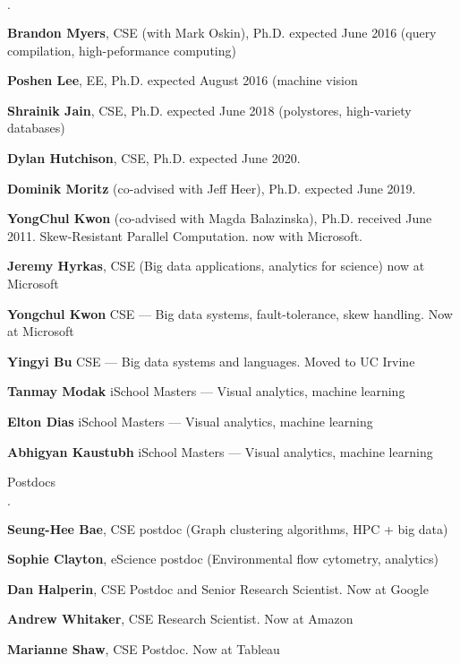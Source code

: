 \documentclass[10pt]{article}
\newenvironment{bulletlist}
   {
      \begin{list}
         {$\cdot$}
         {
            \setlength{\itemsep}{.5ex}
            \setlength{\parsep}{0ex}
            \setlength{\leftmargin}{0.7em}
            \setlength{\parskip}{0ex}
            \setlength{\topsep}{0ex}
         }
   }
   {
      \end{list}
   }
\newcommand{\marginlabel}[1]{
\begin{minipage}[b]{0.8\labelwidth}{\large \textsf{\textbf{#1}}}\end{minipage}}
\newcommand{\entrylabel}[1]{\mbox{\marginlabel{#1}}\hfill}
\newcommand{\MainListlabel}[1]
   {
      \parbox[t]{\labelwidth}{\hspace{.8em}\marginlabel{#1}}
   }
\newenvironment{MainList}[1]
   {
      \renewcommand{\entrylabel}{\MainListlabel}
      \begin{list}{}
      {
         \renewcommand{\makelabel}{\entrylabel}
         \setlength   {\itemindent}{-.65em}
         \setlength   {\labelwidth}{#1}
         \setlength   {\leftmargin}{\labelwidth}
         \setlength   {\itemsep}{3ex}
      }
   }
   {
      \end{list}
   }
\begin{document}
\begin{MainList}{88pt}
\begin{bulletlist}
\item {\bf Brandon Myers}, CSE (with Mark Oskin), Ph.D. expected June 2016 (query compilation, high-peformance computing)
\item {\bf Poshen Lee}, EE, Ph.D. expected August 2016 (machine vision
\item {\bf Shrainik Jain}, CSE, Ph.D. expected June 2018 (polystores, high-variety databases)
\item {\bf Dylan Hutchison}, CSE, Ph.D. expected June 2020.
\item {\bf Dominik Moritz} (co-advised with Jeff Heer), Ph.D. expected June 2019.
\item {\bf YongChul Kwon} (co-advised with Magda Balazinska), Ph.D. received June 2011.
    Skew-Resistant Parallel Computation.  now with Microsoft.
\item {\bf Jeremy Hyrkas}, CSE (Big data applications, analytics for science) now at Microsoft
\item {\bf Yongchul Kwon} CSE — Big data systems, fault-tolerance, skew handling. Now at Microsoft
\item {\bf Yingyi Bu} CSE — Big data systems and languages. Moved to UC Irvine
\item {\bf Tanmay Modak} iSchool Masters — Visual analytics, machine learning
\item {\bf Elton Dias} iSchool Masters — Visual analytics, machine learning
\item {\bf Abhigyan Kaustubh} iSchool Masters — Visual analytics, machine learning
\end{bulletlist}

\item [Postdocs]

\begin{bulletlist}
\item {\bf Seung-Hee Bae}, CSE postdoc (Graph clustering algorithms, HPC + big data)
\item {\bf Sophie Clayton}, eScience postdoc (Environmental flow cytometry, analytics)
\item {\bf Dan Halperin}, CSE Postdoc and Senior Research Scientist. Now at Google
\item {\bf Andrew Whitaker}, CSE Research Scientist.  Now at Amazon
\item {\bf Marianne Shaw}, CSE Postdoc. Now at Tableau
\end{bulletlist}



\end{MainList}
\end{document}
